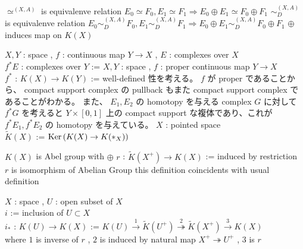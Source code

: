 \begin{Theorem}
\itemprop
  \Then \(\simeq^{(X,A)}\) is equivalenve relation
\itemprop
  \Then \(E_0 \simeq F_0 , E_1 \simeq F_1 \Rightarrow E_0 \oplus E_1 \simeq F_0 \oplus F_1\)
\itemprop
  \Then \(\sim_{D}^{(X,A)}\) is equivalenve relation
\itemprop
  \Then \(E_0 \sim_{D}^{(X,A)} F_0 , E_1 \sim_{D}^{(X,A)} F_1 \Rightarrow E_0 \oplus E_1 \sim_{D}^{(X,A)} F_0 \oplus F_1\)
\itemprop
  \Then \(\oplus\) induces map on \(K(X)\)
\end{Theorem}

\begin{Definition}[複体と写像]
\itemdefi
  \For \(X,Y\) : space , \(f\) : continuous map \(Y \to X\) , \(E\) : complexes over \(X\) \\
  \Define \(f^*E\) : complexes over \(Y\) := 
\itemdefi
  \For \(X,Y\) : space , \(f\) : proper continuous map \(Y \to X\) \\
  \Define \(f^*\) : \(K(X) \to K(Y)\) := 
\itemprof
  well-defined 性を考える。
  \(f\) が proper であることから、 compact support complex の pullback もまた compact support complex であることがわかる。
  また、 \(E_1,E_2\) の homotopy を与える complex \(G\) に対して \(f^*G\) を考えると \(Y \times [0,1]\) 上の compact support な複体であり、これが \(f^* E_1 , f^* E_2\) の homotopy を与えている。
\itemdefi
  \For \(X\) : pointed space \\
  \Define \(\tilde{K}(X)\) := \(\text{Ker} \, {(K(X) \to K(*_X))}\)
\end{Definition}

\begin{Theorem}[\(K(X)\) の基本的な性質]
\itemprop
  \Then \(K(X)\) is Abel group with \(\oplus\)
\itemprop
  \Let \(r\) : \(\tilde{K}(X^+) \to K(X)\) := induced by restriction \\
  \Then \(r\) is isomorphism of Abelian Group
\itemprop
  \Then this definition coincidents with usual definition
\end{Theorem}

\begin{Definition}
\itemdefi
  \For \(X\) : space , \(U\) : open subset of \(X\) \\
  \Let \(i\) := inclusion of \(U \subset X\) \\
  \Define \(i_*\) : \(K(U) \to K(X)\) := \(K(U) \overset{1}{\to} \tilde{K}(U^+) \overset{2}{\twoheadrightarrow} \tilde{K}(X^+) \overset{3}{\to} K(X)\) \\
  where \(1\) is inverse of \(r\) , \(2\) is induced by natural map \(X^+ \twoheadrightarrow U^+\) , \(3\) is \(r\)
\end{Definition}

